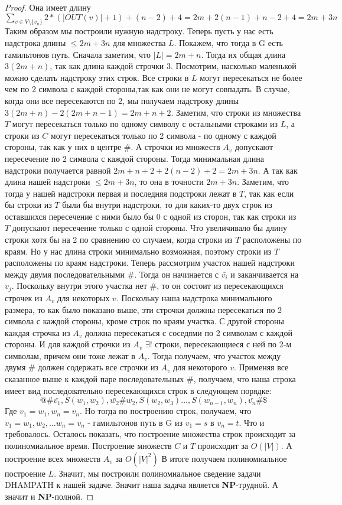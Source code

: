 \documentclass{article}
\begin{document}
\begin{proof}
  Она имеет длину $\sum_{v \in V \setminus \{v_n\}} 2*(|OUT(v)| + 1) + (n-2) + 4 = 2m + 2(n-1) + n-2 + 4 =  
 2m+3n$
 Таким образом мы построили нужную надстроку.
 Теперь пусть у нас есть надстрока длины $\leq 2m+3n$ для множества $L$. Покажем, что тогда в G есть гамильтонов путь.
 Сначала заметим, что $|L|= 2m + n$.
 Тогда их общая длина $3(2m + n)$, так как длина каждой строчки 3. 
 Посмотрим, насколько маленькой можно сделать надстроку этих строк. 
 Все строки в $L$ могут пересекаться не более чем по 2 символа с каждой стороны,так как они не могут совпадать.
 В случае, когда они все пересекаются по 2, мы получаем надстроку длины $3(2m+n) - 2(2m+n-1)= 2m+n+2$.
 Заметим, что строки из множества $T$ могут пересекаться только по одному символу с остальными строками из $L$, а
  строки из $C$ могут пересекаться только по 2 символа - по одному с каждой стороны, так как у них в центре $\#$.
 А строчки из множеств $A_v$  допускают пересечение по 2 символа с каждой стороны.
 Тогда минимальная длина надстроки получается равной $2m+n+2 + 2(n-2) + 2 = 2m+3n$. 
 А так как длина нашей надстроки $\leq 2m+3n$, то она в точности $2m+3n$.
 Заметим, что тогда у нашей надстроки первая и последняя подстроки лежат в $T$, так как если бы строки из $T$ были бы внутри надстроки,
 то для каких-то двух строк из оставшихся пересечение с ними было бы 0 с одной из сторон, так как строки из $T$ допускают пересечение только с одной стороны. Что увеличивало бы длину строки хотя бы на 2 по сравнению со случаем, когда строки из $T$ расположены по краям. Но у нас длина строки минимально возможная, поэтому строки из $T$ расположены по краям надстроки. 
 Теперь рассмотрим участок нашей надстроки между двумя последовательными $\#$. Тогда он начинается с $\bar{v_i}$  и заканчивается на $v_j$.
 Поскольку внутри этого участка нет $\#$, то он состоит из пересекающихся строчек из $A_v$ для некоторых $v$. Поскольку наша надстрока минимального размера, то как было показано выше, эти строчки должны пересекаться по 2 символа с каждой стороны, кроме строк по краям участка. С другой стороны каждая строчка из $A_v$ должна пересекаться с соседями по 2 символам с каждой стороны. И для каждой строчки из $A_v$ $\exists!$ строки, пересекающиеся с ней по 2-м символам, причем они тоже лежат в $A_v$. Тогда получаем, что участок между двумя $\#$ должен содержать все строчки из $A_v$ для некоторого $v$. Применяя все сказанное выше к каждой паре последовательных $\#$, получаем, что наша строка имеет вид последовательно пересекающихся строк в следующем порядке:
 $$@\#\bar{v_1}, S(w_1,w_2), \bar{w_2}\#w_2, S(w_2,w_3) \ldots ,S(w_{n-1},w_n), \bar{v_n}\#\$ $$
 Где $v_1 = w_1,w_n = v_n$. Но тогда по построению строк, получаем, что $v_1 = w_1,w_2, \ldots w_n = v_n$ - гамильтонов путь в G из $v_1=s$ в $v_n=t$. Что и требовалось.
 Осталось показать, что построение множества строк происходит за полиномиальное время.
 Построение множеств $C$ и $T$ происходит за $O(|V|).$ А построение всех множеств $A_v$ за $O(|V|^2)$
 В итоге получаем полиномиальное построение $L$. Значит, мы построили полиномиальное сведение задачи \textsf{DHAMPATH} к нашей задаче. Значит наша задача является \textbf{NP}-трудной. А значит и \textbf{NP}-полной.
 \end{proof}
\end{document}
